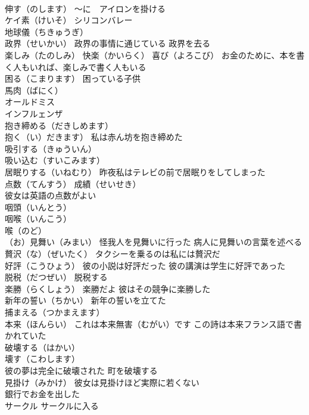 \documentclass[8pt]{extreport}
\begin{document}
\begin{CJK}{UTF8}{min}
\\	伸す（のします） ～に　アイロンを掛ける
\\	ケイ素（けいそ） シリコンバレー
\\	地球儀（ちきゅうぎ）
\\	政界（せいかい） 政界の事情に通じている 政界を去る
\\	楽しみ（たのしみ） 快楽（かいらく） 喜び（よろこび） お金のために、本を書く人もいれば、楽しみで書く人もいる
\\	困る（こまります） 困っている子供
\\	馬肉（ばにく）
\\	オールドミス
\\	インフルェンザ
\\	抱き締める（だきしめます）
\\	抱く（い）だきます） 私は赤ん坊を抱き締めた
\\	吸引する（きゅういん） 
\\	吸い込む（すいこみます）
\\	居眠りする（いねむり） 昨夜私はテレビの前で居眠りをしてしまった
\\	点数（てんすう） 成績（せいせき）
\\	彼女は英語の点数がよい
\\	咽頭（いんとう）
\\	咽喉（いんこう）
\\	喉（のど） 
\\	（お）見舞い（みまい） 怪我人を見舞いに行った 病人に見舞いの言葉を述べる
\\	贅沢（な）（ぜいたく） タクシーを乗るのは私には贅沢だ
\\	好評（こうひょう） 彼の小説は好評だった 彼の講演は学生に好評であった
\\	脱税（だつぜい） 脱税する
\\	楽勝（らくしょう） 楽勝だよ 彼はその競争に楽勝した
\\	新年の誓い（ちかい） 新年の誓いを立てた
\\	捕まえる（つかまえます）
\\	本来（ほんらい） これは本来無害（むがい）です この詩は本来フランス語で書かれていた
\\	破壊する（はかい）
\\	壊す（こわします）
\\	彼の夢は完全に破壊された 町を破壊する
\\	見掛け（みかけ） 彼女は見掛けほど実際に若くない
\\	銀行でお金を出した
\\	サークル サークルに入る

\end{CJK}
\end{document}
